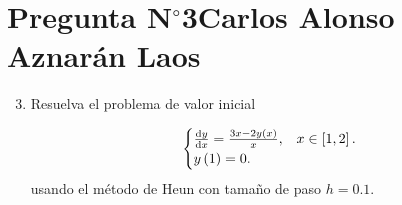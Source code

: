 \section{Pregunta N$^{\circ}$3\qquad Carlos Alonso Aznarán Laos}



\begin{frame}[fragile]
    \begin{enumerate}\setcounter{enumi}{2}
        \item

              Resuelva el problema de valor inicial

              \begin{equation*}
                  \begin{cases}
                      \diff{y}{x}=\frac{3x-2y\left(x\right)}{x},
                       & x\in\left[1,2\right]. \\
                      y\left(1\right)=0.
                       &
                  \end{cases}
              \end{equation*}
              usando el método de Heun con tamaño de paso $h=0.1$.
    \end{enumerate}

    \begin{solution}
        \begin{columns}
            \begin{column}{0.38\textwidth}
                \inputminted[fontsize=\tiny,firstline=3,lastline=4]{python}{p3.py}
                \inputminted[fontsize=\tiny,firstline=10,lastline=11]{python}{p3.py}
                \inputminted[fontsize=\tiny,firstline=14,lastline=15]{python}{p3.py}
                \inputminted[fontsize=\tiny,firstline=18,lastline=21]{python}{p3.py}
                \inputminted[fontsize=\tiny,firstline=23,lastline=25]{python}{p3.py}
            \end{column}
            \begin{column}{0.58\textwidth}
                \inputminted[fontsize=\tiny,firstline=28,lastline=31]{python}{p3.py}
            \end{column}
        \end{columns}
    \end{solution}
\end{frame}

